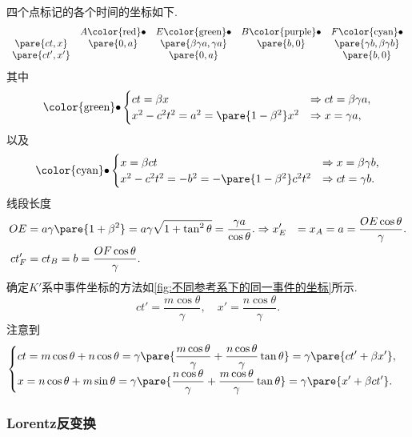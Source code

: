 \documentclass[hidelinks]{ctexart}
\begin{document}
四个点标记的各个时间的坐标如下.
\[ \begin{array}{ccccc}
    & A \text{\color{red}$\bullet$} & E \text{\color{green}$\bullet$} & B \text{\color{purple}$\bullet$} & F \text{\color{cyan}$\bullet$} \\
    \pare{ct,x} & \pare{0,a} & \pare{\beta \gamma a,\gamma a} & \pare{b,0} & \pare{\gamma b,\beta \gamma b} \\
    \pare{ct',x'} & & \pare{0,a} & & \pare{b,0}
\end{array} \]
其中
\[ \text{\color{green}$\bullet$} \begin{cases}
    ct = \beta x & \Rightarrow ct = \beta \gamma a,\\
    x^2 - c^2t^2 = a^2 = \pare{1-\beta^2}x^2 & \Rightarrow x = \gamma a,
\end{cases} \]
以及
\[ \text{\color{cyan}$\bullet$} \begin{cases}
    x = \beta ct & \Rightarrow x = \beta\gamma b, \\
    x^2 - c^2t^2 = -b^2 = -\pare{1-\beta^2}c^2t^2 & \Rightarrow ct = \gamma b.
\end{cases} \]
线段长度
\begin{align*}
    OE &= a\gamma\pare{1+\beta^2} = a\gamma\sqrt{1+\tan^2\theta} = \frac{\gamma a}{\cos\theta}.
    \Rightarrow x'_E &= x_A = a = \frac{OE\cos\theta}{\gamma}. \\
    ct'_F &= ct_B = b = \frac{OF\cos\theta}{\gamma}.
\end{align*}
确定$K'$系中事件坐标的方法如\cref{fig:不同参考系下的同一事件的坐标}所示.
\[ ct' = \frac{m\cos\theta}{\gamma},\quad x' = \frac{n\cos\theta}{\gamma}. \]
注意到
\[ \begin{cases}
    \displaystyle ct = m\cos\theta + n\cos\theta = \gamma\pare{\frac{m\cos\theta}{\gamma} + \frac{n\cos\theta}{\gamma} \tan\theta} = \gamma\pare{ct' + \beta x'}, \\
    \displaystyle x = n\cos\theta + m\sin\theta = \gamma\pare{\frac{n\cos\theta}{\gamma} + \frac{m\cos\theta}{\gamma}\tan\theta} = \gamma\pare{x' + \beta ct'}.
\end{cases} \]



\subsubsection{Lorentz反变换} %
\label{ssub:lorentz反变换}
\end{document}
